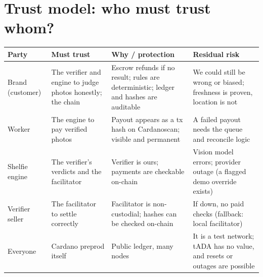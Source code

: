 \section{Trust model: who must trust whom?}
\begin{center}
\end{center}

\begin{center}
\small
\begin{tabularx}{\textwidth}{@{}l X X X@{}}
\toprule
\textbf{Party} & \textbf{Must trust} & \textbf{Why / protection} & \textbf{Residual risk}\\
\midrule
Brand (customer) & The verifier and engine to judge photos honestly; the chain & Escrow refunds if no result; rules are deterministic; ledger and hashes are auditable & We could still be wrong or biased; freshness is proven, location is not\\
Worker & The engine to pay verified photos & Payout appears as a tx hash on Cardanoscan; visible and permanent & A failed payout needs the queue and reconcile logic\\
Shelfie engine & The verifier's verdicts and the facilitator & Verifier is ours; payments are checkable on-chain & Vision model errors; provider outage (a flagged demo override exists)\\
Verifier seller & The facilitator to settle correctly & Facilitator is non-custodial; hashes can be checked on-chain & If down, no paid checks (fallback: local facilitator)\\
Everyone & Cardano preprod itself & Public ledger, many nodes & It is a test network; tADA has no value, and resets or outages are possible\\
\bottomrule
\end{tabularx}
\end{center}


